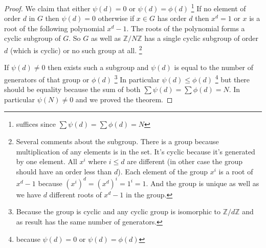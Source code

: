 \begin{theorem}
\begin{proof}
    We claim that either $\psi\left(d\right) = 0$ or
    $\psi\left(d\right) = \phi\left(d\right)$
    \footnote{
      suffices since $\sum \psi\left(d\right) = \sum
      \phi\left(d\right) = N$
    }
    If no element of order $d$ in $G$ then $\psi\left(d\right) = 0$
    otherwise if $x \in G$ has order $d$ then $x^d = 1$ or $x$ is a
    root of the following polynomial $x^d - 1$. The roots of the
    polynomial forms a cyclic subgroup of $G$.
    So $G$ as well as
    $\mathbb{Z}/N\mathbb{Z}$ has a single cyclic subgroup of order
    $d$ (which is cyclic) or no such group at all.
    \footnote{
      Several comments about the subgroup. There is a group
      because multiplication of any elements is in the set. It's
      cyclic because it's generated by one element.
      All $x^i$ where $i \le d$ are different (in other case the group
      should have an order less than $d$). Each element of the group
      $x^i$ is a root of $x^d - 1$ because $(x^i)^d = (x^d)^i = 1^i =
      1$. And the group is unique as well as we have $d$ different
      roots of $x^d-1$ in the group. 
    }

    
    If $\psi\left(d\right) \ne 0$ then exists such a subgroup and
    $\psi\left(d\right)$ is equal to the number of generators of that
    group or $\phi\left(d\right)$
    \footnote{
      Because the group is cyclic and any cyclic group is isomorphic
      to $\mathbb{Z}/d\mathbb{Z}$ and as result has the same number of
      generators. 
    }
    In particular $\psi\left(d\right) \le \phi\left(d\right)$
    \footnote{
      because $\psi\left(d\right) = 0$ or
      $\psi\left(d\right) = \phi\left(d\right)$
    }
    but there should be equality because the sum of both $\sum
    \psi\left(d\right) = \sum \phi\left(d\right) = N$.
    In particular $\psi\left(N\right) \ne 0$ and we proved the
    theorem.
  \end{proof}
  \label{thm:lec3_2}
\end{theorem}
